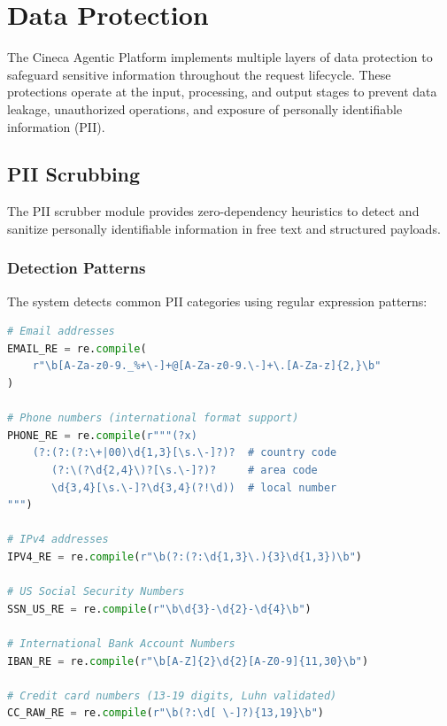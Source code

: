 
\section{Data Protection}
\label{sec:data-protection}

The Cineca Agentic Platform implements multiple layers of data protection to safeguard sensitive information throughout the request lifecycle. These protections operate at the input, processing, and output stages to prevent data leakage, unauthorized operations, and exposure of personally identifiable information (PII).

\subsection{PII Scrubbing}
\label{subsec:pii-scrubbing}

The PII scrubber module provides zero-dependency heuristics to detect and sanitize personally identifiable information in free text and structured payloads.

\subsubsection{Detection Patterns}

The system detects common PII categories using regular expression patterns:

\begin{lstlisting}[language=Python,caption={PII detection patterns}]
# Email addresses
EMAIL_RE = re.compile(
    r"\b[A-Za-z0-9._%+\-]+@[A-Za-z0-9.\-]+\.[A-Za-z]{2,}\b"
)

# Phone numbers (international format support)
PHONE_RE = re.compile(r"""(?x)
    (?:(?:(?:\+|00)\d{1,3}[\s.\-]?)?  # country code
       (?:\(?\d{2,4}\)?[\s.\-]?)?     # area code
       \d{3,4}[\s.\-]?\d{3,4}(?!\d))  # local number
""")

# IPv4 addresses
IPV4_RE = re.compile(r"\b(?:(?:\d{1,3}\.){3}\d{1,3})\b")

# US Social Security Numbers
SSN_US_RE = re.compile(r"\b\d{3}-\d{2}-\d{4}\b")

# International Bank Account Numbers
IBAN_RE = re.compile(r"\b[A-Z]{2}\d{2}[A-Z0-9]{11,30}\b")

# Credit card numbers (13-19 digits, Luhn validated)
CC_RAW_RE = re.compile(r"\b(?:\d[ \-]?){13,19}\b")
\end{lstlisting}

